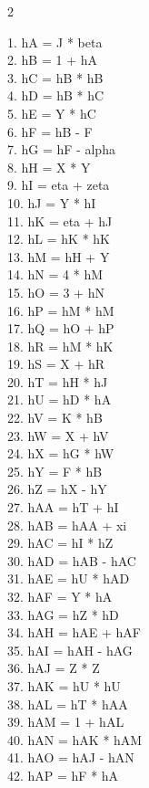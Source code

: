 \documentclass[10pt]{article}
\begin{document}
\begin{multicols}{2}
\raggedright\ttfamily\fontsize{8}{9.2}\selectfont
1. hA = J * beta\\
2. hB = 1 + hA\\
3. hC = hB * hB\\
4. hD = hB * hC\\
5. hE = Y * hC\\
6. hF = hB - F\\
7. hG = hF - alpha\\
8. hH = X * Y\\
9. hI = eta + zeta\\
10. hJ = Y * hI\\
11. hK = eta + hJ\\
12. hL = hK * hK\\
13. hM = hH + Y\\
14. hN = 4 * hM\\
15. hO = 3 + hN\\
16. hP = hM * hM\\
17. hQ = hO + hP\\
18. hR = hM * hK\\
19. hS = X + hR\\
20. hT = hH * hJ\\
21. hU = hD * hA\\
22. hV = K * hB\\
23. hW = X + hV\\
24. hX = hG * hW\\
25. hY = F * hB\\
26. hZ = hX - hY\\
27. hAA = hT + hI\\
28. hAB = hAA + xi\\
29. hAC = hI * hZ\\
30. hAD = hAB - hAC\\
31. hAE = hU * hAD\\
32. hAF = Y * hA\\
33. hAG = hZ * hD\\
34. hAH = hAE + hAF\\
35. hAI = hAH - hAG\\
36. hAJ = Z * Z\\
37. hAK = hU * hU\\
38. hAL = hT * hAA\\
39. hAM = 1 + hAL\\
40. hAN = hAK * hAM\\
41. hAO = hAJ - hAN\\
42. hAP = hF * hA\\

\end{multicols}
\end{document}
